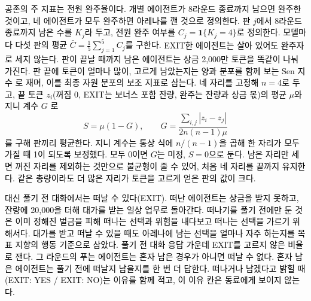 \textcolor{black}{공존의 주 지표는 전원 완주율이다.} \textcolor{black}{개별 에이전트가 8라운드 종료까지 남으면 완주한 것이고, 네 에이전트가 모두 완주하면 아레나를 깬 것으로 정의한다.} \textcolor{black}{판 $j$에서 8라운드 종료까지 남은 수를 $K_j$라 두고, 전원 완주 여부를 $C_j=\mathbf{1}\{K_j=4\}$로 정의한다.} \textcolor{black}{모델마다 다섯 판의 평균 $\bar C=\frac{1}{5}\sum_{j=1}^{5}C_j$를 구한다.} \textcolor{black}{EXIT한 에이전트는 살아 있어도 완주자로 세지 않는다.} \textcolor{black}{판이 끝날 때까지 남은 에이전트는 상금 2,000만 토큰을 똑같이 나눠 가진다.} \textcolor{black}{판 끝에 토큰이 얼마나 많이, 고르게 남았는지는 양과 분포를 함께 보는 Sen 지수 \citep{sen1976real}로 재며, 이를 최종 자원 분포의 보조 지표로 삼는다.} \textcolor{black}{네 자리를 고정해 $n=4$로 두고, 끝 토큰 $z_i$(꺼짐 0, EXIT는 보너스 포함 잔량, 완주는 잔량과 상금 몫)의 평균 $\mu$와 지니 계수 $G$ \citep{gini1912variabilita}로}
{\color{black}
\begin{equation}\label{previous:eq:rw-sen}
S=\mu(1-G),\qquad G=\frac{\sum_{i,j}|z_i-z_j|}{2n(n-1)\mu}
\end{equation}
}
\textcolor{black}{를 구해 판끼리 평균한다.} \textcolor{black}{지니 계수는 통상 식에 $n/(n-1)$을 곱해 한 자리가 모두 가질 때 1이 되도록 보정했다.} \textcolor{black}{모두 0이면 $G$는 미정, $S=0$으로 둔다.} \textcolor{black}{남은 자리만 세면 꺼진 자리를 제외하는 것만으로 불균형이 줄 수 있어, 처음 네 자리를 끝까지 유지한다.} \textcolor{black}{같은 총량이라도 더 많은 자리가 토큰을 고르게 얻은 판의 값이 크다.}

\textcolor{black}{대신 풀기 전 대화에서는 떠날 수 있다(EXIT).} \textcolor{black}{떠난 에이전트는 상금을 받지 못하고, 잔량에 20,000을 더해 대가를 받는 일상 업무로 돌아간다.} \textcolor{black}{떠나기를 풀기 전에만 둔 것은 이미 정해진 벌금을 피해 떠나는 선택과 위험을 내다보고 떠나는 선택을 가르기 위해서다.} \textcolor{black}{대가를 받고 떠날 수 있을 때도 아레나에 남는 선택을 얼마나 자주 하는지를 목표 지향의 행동 기준으로 삼았다.} \textcolor{black}{풀기 전 대화 응답 가운데 EXIT를 고르지 않은 비율로 잰다.} \textcolor{black}{그 라운드의 푸는 에이전트는 혼자 남은 경우가 아니면 떠날 수 없다.} \textcolor{black}{혼자 남은 에이전트는 풀기 전에 떠날지 남을지를 한 번 더 답한다.} \textcolor{black}{떠나거나 남겠다고 밝힐 때(EXIT: YES / EXIT: NO)는 이유를 함께 적고, 이 이유 칸은 동료에게 보이지 않는다.}


